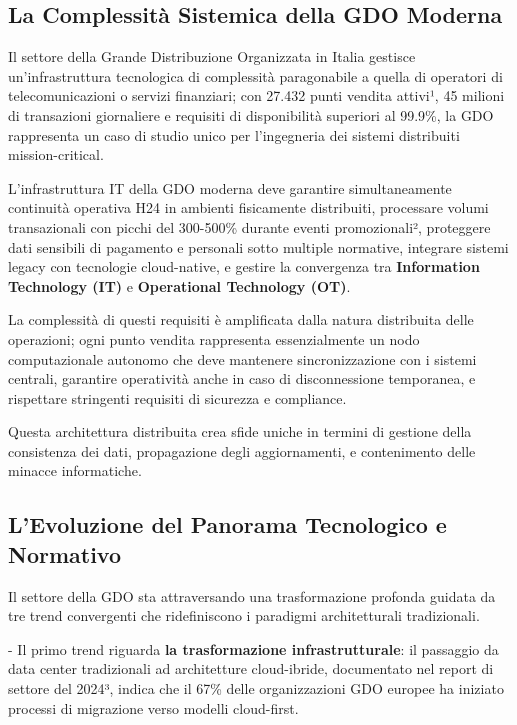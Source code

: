 \documentclass[12pt,a4paper,oneside]{book}
\begin{document}
\subsection{\texorpdfstring{\textbf{La Complessità Sistemica
della GDO
Moderna}}{1.1.1 La Complessità Sistemica della GDO Moderna}}\label{la-complessituxe0-sistemica-della-gdo-moderna}

Il settore della Grande Distribuzione Organizzata in Italia gestisce
un'infrastruttura tecnologica di complessità paragonabile a quella di
operatori di telecomunicazioni o servizi finanziari; con 27.432 punti
vendita attivi¹, 45 milioni di transazioni giornaliere e requisiti di
disponibilità superiori al 99.9\%, la GDO rappresenta un caso di studio
unico per l'ingegneria dei sistemi distribuiti mission-critical.

L'infrastruttura IT della GDO moderna deve garantire simultaneamente
continuità operativa H24 in ambienti fisicamente distribuiti, processare
volumi transazionali con picchi del 300-500\% durante eventi
promozionali², proteggere dati sensibili di pagamento e personali sotto
multiple normative, integrare sistemi legacy con tecnologie
cloud-native, e gestire la convergenza tra \textbf{Information Technology (IT)} e
\textbf{Operational Technology (OT)}.

La complessità di questi requisiti è amplificata dalla natura
distribuita delle operazioni; ogni punto vendita rappresenta
essenzialmente un nodo computazionale autonomo che deve mantenere
sincronizzazione con i sistemi centrali, garantire operatività anche in
caso di disconnessione temporanea, e rispettare stringenti requisiti di
sicurezza e compliance.

Questa architettura distribuita crea sfide uniche in termini di gestione
della consistenza dei dati, propagazione degli aggiornamenti, e
contenimento delle minacce informatiche.

\subsection{\texorpdfstring{\textbf{L'Evoluzione del Panorama
Tecnologico e
Normativo}}{L'Evoluzione del Panorama Tecnologico e Normativo}}\label{levoluzione-del-panorama-tecnologico-e-normativo}

Il settore della GDO sta attraversando una trasformazione profonda
guidata da tre trend convergenti che ridefiniscono i paradigmi
architetturali tradizionali.

- Il primo trend riguarda \textbf{la trasformazione infrastrutturale}:
il passaggio da data center tradizionali ad architetture cloud-ibride,
documentato nel report di settore del 2024³, indica che il 67\% delle
organizzazioni GDO europee ha iniziato processi di migrazione verso
modelli cloud-first.
\end{document}
